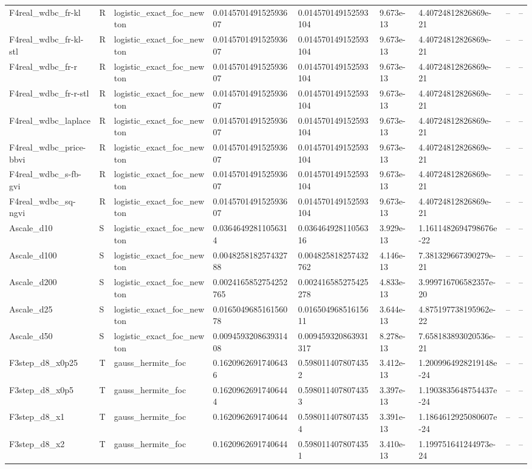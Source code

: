 \begin{tabular}{lllllllll}
F4real\_wdbc\_fr-kl & R & logistic\_exact\_foc\_newton & 0.014570149152593607 & 0.014570149152593104 & 9.673e-13 & 4.40724812826869e-21 & -- & -- \\
F4real\_wdbc\_fr-kl-stl & R & logistic\_exact\_foc\_newton & 0.014570149152593607 & 0.014570149152593104 & 9.673e-13 & 4.40724812826869e-21 & -- & -- \\
F4real\_wdbc\_fr-r & R & logistic\_exact\_foc\_newton & 0.014570149152593607 & 0.014570149152593104 & 9.673e-13 & 4.40724812826869e-21 & -- & -- \\
F4real\_wdbc\_fr-r-stl & R & logistic\_exact\_foc\_newton & 0.014570149152593607 & 0.014570149152593104 & 9.673e-13 & 4.40724812826869e-21 & -- & -- \\
F4real\_wdbc\_laplace & R & logistic\_exact\_foc\_newton & 0.014570149152593607 & 0.014570149152593104 & 9.673e-13 & 4.40724812826869e-21 & -- & -- \\
F4real\_wdbc\_price-bbvi & R & logistic\_exact\_foc\_newton & 0.014570149152593607 & 0.014570149152593104 & 9.673e-13 & 4.40724812826869e-21 & -- & -- \\
F4real\_wdbc\_s-fb-gvi & R & logistic\_exact\_foc\_newton & 0.014570149152593607 & 0.014570149152593104 & 9.673e-13 & 4.40724812826869e-21 & -- & -- \\
F4real\_wdbc\_sq-ngvi & R & logistic\_exact\_foc\_newton & 0.014570149152593607 & 0.014570149152593104 & 9.673e-13 & 4.40724812826869e-21 & -- & -- \\
Ascale\_d10 & S & logistic\_exact\_foc\_newton & 0.03646492811056314 & 0.03646492811056316 & 3.929e-13 & 1.1611482694798676e-22 & -- & -- \\
Ascale\_d100 & S & logistic\_exact\_foc\_newton & 0.004825818257432788 & 0.004825818257432762 & 4.146e-13 & 7.381329667390279e-21 & -- & -- \\
Ascale\_d200 & S & logistic\_exact\_foc\_newton & 0.0024165852754252765 & 0.002416585275425278 & 4.833e-13 & 3.999716706582357e-20 & -- & -- \\
Ascale\_d25 & S & logistic\_exact\_foc\_newton & 0.016504968516156078 & 0.01650496851615611 & 3.644e-13 & 4.875197738195962e-22 & -- & -- \\
Ascale\_d50 & S & logistic\_exact\_foc\_newton & 0.009459320863931408 & 0.009459320863931317 & 8.278e-13 & 7.658183893020536e-21 & -- & -- \\
F3step\_d8\_x0p25 & T & gauss\_hermite\_foc & 0.16209626917406436 & 0.5980114078074352 & 3.412e-13 & 1.2009964928219148e-24 & -- & -- \\
F3step\_d8\_x0p5 & T & gauss\_hermite\_foc & 0.16209626917406444 & 0.5980114078074353 & 3.397e-13 & 1.1903835648754437e-24 & -- & -- \\
F3step\_d8\_x1 & T & gauss\_hermite\_foc & 0.1620962691740644 & 0.5980114078074354 & 3.391e-13 & 1.1864612925080607e-24 & -- & -- \\
F3step\_d8\_x2 & T & gauss\_hermite\_foc & 0.1620962691740644 & 0.5980114078074351 & 3.410e-13 & 1.199751641244973e-24 & -- & -- \\
\bottomrule
\end{tabular}
